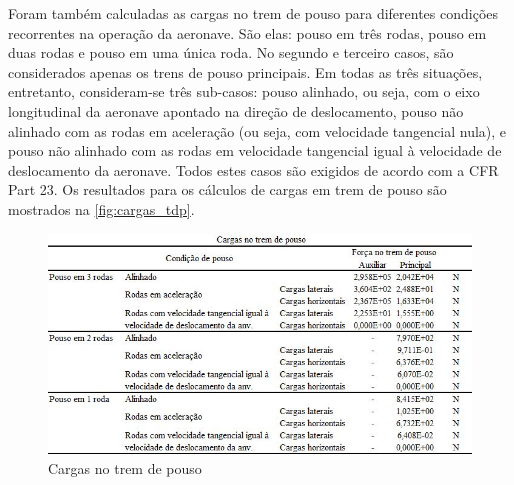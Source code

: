 Foram também calculadas as cargas no trem de pouso para diferentes condições recorrentes na operação da aeronave. São elas: pouso em três rodas, pouso em duas rodas e pouso em uma única roda. No segundo e terceiro casos, são considerados apenas os trens de pouso principais. Em todas as três situações, entretanto, consideram-se três sub-casos: pouso alinhado, ou seja, com o eixo longitudinal da aeronave apontado na direção de deslocamento, pouso não alinhado com as rodas em aceleração (ou seja, com velocidade tangencial nula), e pouso não alinhado com as rodas em velocidade tangencial igual à velocidade de deslocamento da aeronave. Todos estes casos são exigidos de acordo com a CFR Part 23.
Os resultados para os cálculos de cargas em trem de pouso são mostrados na \autoref{fig:cargas_tdp}.

\begin{figure}
\centering
\includegraphics[width=\textwidth]{cargas/imagens/Cargas_tdp.JPG}
\caption{Cargas no trem de pouso}
\label{fig:cargas_tdp}
\end{figure}
